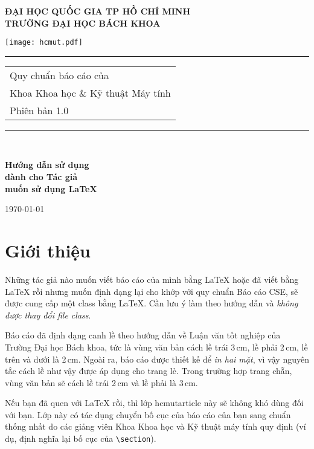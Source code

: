 \documentclass{hcmutarticle}
\begin{document}
\thispagestyle{empty}
\begin{center}
\LARGE\bfseries ĐẠI HỌC QUỐC GIA TP HỒ CHÍ MINH \\
TRƯỜNG ĐẠI HỌC BÁCH KHOA
\end{center}

\begin{center}
\texttt{[image: hcmut.pdf]}\\[2cm]
\end{center}

\noindent
\rule{\textwidth}{1pt}
\vspace{2pt}
\begin{flushright}
	\Huge
	\begin{tabular}{@{}l}
		Quy chuẩn báo cáo \LaTeXe{} của\\
		Khoa Khoa học \& Kỹ thuật Máy tính\\[6pt]
		{\Large Phiên bản 1.0}
	\end{tabular}
\end{flushright}
\rule{\textwidth}{1pt}\\[1cm]
\begin{flushright}
	\LARGE\bfseries Hướng dẫn sử dụng \\dành cho Tác giả\\
	muốn sử dụng \LaTeX
\end{flushright}
\vfill
\begin{center}
{\Large \today}
\end{center}

%
\newpage
\tableofcontents
\newpage
%


\section{Giới thiệu}
%

Những tác giả nào muốn viết báo cáo của mình bằng \LaTeX{} hoặc đã viết bằng \LaTeX{} rồi nhưng muốn định dạng lại cho khớp với quy chuẩn Báo cáo CSE, sẽ được cung cấp một class bằng \LaTeX{}. Cần lưu ý làm theo hướng dẫn và {\em không được thay đổi file class}.

Báo cáo đã định dạng canh lề theo hướng dẫn về Luận văn tốt nghiệp của Trường Đại học Bách khoa, tức là vùng văn bản cách lề trái 3\,cm, lề phải 2\,cm, lề trên và dưới là 2\,cm. Ngoài ra, báo cáo được thiết kế để {\em in hai mặt}, vì vậy nguyên tắc cách lề như vậy được áp dụng cho trang lẻ. Trong trường hợp trang chẵn, vùng văn bản sẽ cách lề trái 2\,cm và lề phải là 3\,cm.

Nếu bạn đã quen với \LaTeX{} rồi, thì lớp hcmutarticle này sẽ không khó dùng đối với bạn. Lớp này có tác dụng chuyển bố cục của báo cáo của bạn sang chuẩn thống nhất do các giảng viên Khoa Khoa học và Kỹ thuật máy tính quy định (ví dụ, định nghĩa lại bố cục của \verb|\section|).
\end{document}
